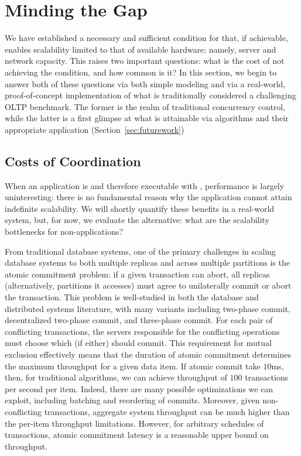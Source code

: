 
\section{Minding the Gap}
\label{sec:evaluation}

We have established a necessary and sufficient condition for \cfreedom
that, if achievable, enables scalability limited to that of available
hardware: namely, server and network capacity. This raises two
important questions: what is the cost of not achieving the \cfree
condition, and how common is it? In this section, we begin to answer
both of these questions via both simple modeling and via a real-world,
proof-of-concept implementation of what is traditionally considered a
challenging OLTP benchmark. The former is the realm of traditional
concurrency control, while the latter is a first glimpse at what is
attainable via \cfree algorithms and their appropriate application
(Section~\ref{sec:futurework})

\subsection{Costs of Coordination}

When an application is \iconfluent and therefore executable with
\cfreedom, performance is largely uninteresting: there is no
fundamental reason why the application cannot attain indefinite
scalability. We will shortly quantify these benefits in a real-world
system, but, for now, we evaluate the alternative: what are the
scalability bottlenecks for non-\cfree applications?

From traditional database systems, one of the primary challenges in
scaling database systems to both multiple replicas and across multiple
partitions is the atomic commitment problem: if a given transaction
can abort, all replicas (alternatively, partitions it accesses) must
agree to unilaterally commit or abort the transaction. This problem is
well-studied in both the database and distributed systems literature,
with many variants including two-phase commit, decentralized two-phase
commit, and three-phase commit. For each pair of conflicting
transactions, the servers responsible for the conflicting operations
must choose which (if either) should commit. This requirement for
mutual exclusion effectively means that the duration of atomic
commitment determines the maximum throughput for a given data item. If
atomic commit take $10$ms, then, for traditional algorithms, we can
achieve throughput of $100$ transactions per second per item. Indeed,
there are many possible optimizations we can exploit, including
batching and reordering of commits. Moreover, given non-conflicting
transactions, aggregate system throughput can be much higher than the
per-item throughput limitations. However, for arbitrary schedules of
transactions, atomic commitment latency is a reasonable upper bound on
throughput.

